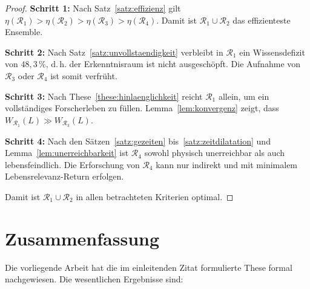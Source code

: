 ﻿\documentclass[a4paper,12pt]{article}
\theoremstyle{definition}
\begin{document}
\begin{proof}
    \textbf{Schritt 1:} Nach Satz~\ref{satz:effizienz} gilt
    $\eta(\mathcal{R}_1) > \eta(\mathcal{R}_2) > \eta(\mathcal{R}_3) > \eta(\mathcal{R}_4)$.
    Damit ist $\mathcal{R}_1 \cup \mathcal{R}_2$ das effizienteste Ensemble.

    \textbf{Schritt 2:} Nach Satz~\ref{satz:unvollstaendigkeit} verbleibt
    in $\mathcal{R}_1$ ein Wissensdefizit von $48{,}3\,\%$, d.\,h. der
    Erkenntnisraum ist nicht ausgeschöpft. Die Aufnahme von $\mathcal{R}_3$
    oder $\mathcal{R}_4$ ist somit verfrüht.

    \textbf{Schritt 3:} Nach These~\ref{these:hinlaenglichkeit} reicht
    $\mathcal{R}_1$ allein, um ein vollständiges Forscherleben zu füllen.
    Lemma~\ref{lem:konvergenz} zeigt, dass $W_{\mathcal{R}_1}(L) \gg
    W_{\mathcal{R}_3}(L)$.

    \textbf{Schritt 4:} Nach den Sätzen~\ref{satz:gezeiten}
    bis~\ref{satz:zeitdilatation} und Lemma~\ref{lem:unerreichbarkeit}
    ist $\mathcal{R}_4$ sowohl physisch unerreichbar als auch lebensfeindlich.
    Die Erforschung von $\mathcal{R}_4$ kann nur indirekt und mit
    minimalem Lebensrelevanz-Return erfolgen.

    Damit ist $\mathcal{R}_1 \cup \mathcal{R}_2$ in allen betrachteten
    Kriterien optimal. \qedhere
\end{proof}

\section{Zusammenfassung}

Die vorliegende Arbeit hat die im einleitenden Zitat formulierte These formal
nachgewiesen. Die wesentlichen Ergebnisse sind:
\end{document}
